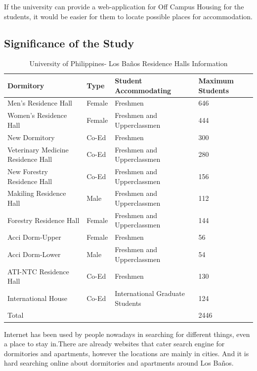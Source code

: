 \documentclass[journal]{./IEEE/IEEEtran}
\begin{document}
If the university can provide a web-application for Off Campus Housing for the students, it would be easier for them to locate possible places for accommodation.
\subsection{Significance of the Study}
\begin{table}
	\centering
	\caption{University of Philippines- Los Ba\~{n}os Residence Halls Information }
    \begin{tabular}{ | p{1.5cm} | p{1.5cm} | p{1.5cm} | p{1.5cm}|}
    \hline
    Dormitory & Type &  Student Accommodating & Maximum Students \\ \hline
    Men's Residence Hall & Female & Freshmen & 646 \cite{electronic_men} \\ \hline
  	Women's Residence Hall & Female & Freshmen and Upperclassmen & 444 \cite{electronic_wmen} \\ \hline
  	New Dormitory & Co-Ed & Freshmen & 300 \cite{electronic_new} \\ \hline
  	Veterinary Medicine Residence Hall & Co-Ed & Freshmen and Upperclassmen & 280 \cite{electronic_vet} \\ \hline
  	New Forestry Residence Hall & Co-Ed & Freshmen and Upperclassmen & 156 \cite{electronic_nfrh} \\ \hline
  	Makiling Residence Hall & Male & Freshmen and Upperclassmen & 112 \cite{electronic_mareha} \\ \hline
  	Forestry Residence Hall & Female & Freshmen and Upperclassmen & 144  \cite{electronic_foreha} \\ \hline
  	Acci Dorm-Upper & Female & Freshmen & 56  \cite{electronic_au}\\ \hline
  	Acci Dorm-Lower & Male & Freshmen and Upperclassmen & 54  \cite{electronic_al} \\ \hline
  	ATI-NTC Residence Hall & Co-Ed & Freshmen & 130 \cite{electronic_ati} \\ \hline
  	International House & Co-Ed & International Graduate Students & 124 \cite{electronic_ih} \\ \hline
  	Total &&& 2446\\ \hline 
    \end{tabular}
    
	\end{table}	
Internet has been used by people nowadays in searching for different things, even a place to stay in.There are already websites that cater search engine for dormitories and apartments, however the locations are mainly in cities.  And it is hard searching online about dormitories and apartments around Los Ba\~{n}os.
\end{document}
